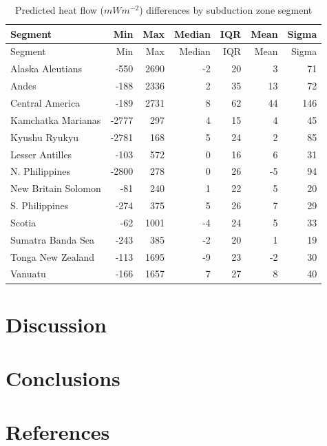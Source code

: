 \documentclass[draft,linenumbers]{agujournal2018}
\begin{document}
\hypertarget{tbl:diff.summary.table}{}
\begin{longtable}[]{@{}lrrrrrr@{}}
\caption{\label{tbl:diff.summary.table}Predicted heat flow
(\(mWm^{-2}\)) differences by subduction zone segment}\tabularnewline
\toprule
Segment & Min & Max & Median & IQR & Mean & Sigma \\
\midrule
\endfirsthead
\toprule
Segment & Min & Max & Median & IQR & Mean & Sigma \\
\midrule
\endhead
Alaska Aleutians & -550 & 2690 & -2 & 20 & 3 & 71 \\
Andes & -188 & 2336 & 2 & 35 & 13 & 72 \\
Central America & -189 & 2731 & 8 & 62 & 44 & 146 \\
Kamchatka Marianas & -2777 & 297 & 4 & 15 & 4 & 45 \\
Kyushu Ryukyu & -2781 & 168 & 5 & 24 & 2 & 85 \\
Lesser Antilles & -103 & 572 & 0 & 16 & 6 & 31 \\
N. Philippines & -2800 & 278 & 0 & 26 & -5 & 94 \\
New Britain Solomon & -81 & 240 & 1 & 22 & 5 & 20 \\
S. Philippines & -274 & 375 & 5 & 26 & 7 & 29 \\
Scotia & -62 & 1001 & -4 & 24 & 5 & 33 \\
Sumatra Banda Sea & -243 & 385 & -2 & 20 & 1 & 19 \\
Tonga New Zealand & -113 & 1695 & -9 & 23 & -2 & 30 \\
Vanuatu & -166 & 1657 & 7 & 27 & 8 & 40 \\
\bottomrule
\end{longtable}

\section{Discussion}

\section{Conclusions}

\acknowledgments

\clearpage

\section*{References}
\end{document}

